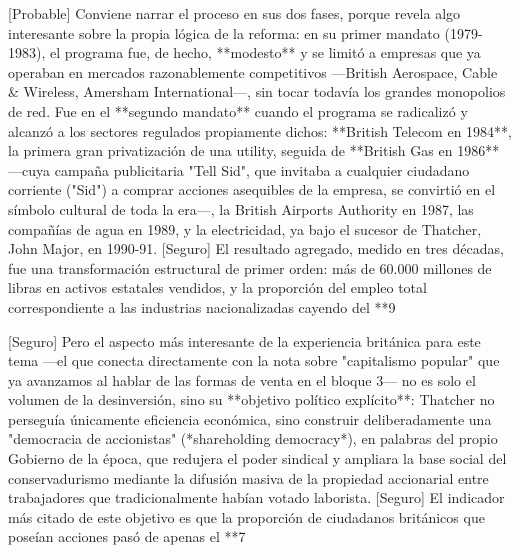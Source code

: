 \documentclass[10pt,a4paper]{article}
\begin{document}
[Probable] Conviene narrar el proceso en sus dos fases, porque revela algo interesante sobre la propia lógica de la reforma: en su primer mandato (1979-1983), el programa fue, de hecho, **modesto** y se limitó a empresas que ya operaban en mercados razonablemente competitivos —British Aerospace, Cable & Wireless, Amersham International—, sin tocar todavía los grandes monopolios de red. Fue en el **segundo mandato** cuando el programa se radicalizó y alcanzó a los sectores regulados propiamente dichos: **British Telecom en 1984**, la primera gran privatización de una utility, seguida de **British Gas en 1986** —cuya campaña publicitaria "Tell Sid", que invitaba a cualquier ciudadano corriente ("Sid") a comprar acciones asequibles de la empresa, se convirtió en el símbolo cultural de toda la era—, la British Airports Authority en 1987, las compañías de agua en 1989, y la electricidad, ya bajo el sucesor de Thatcher, John Major, en 1990-91. [Seguro] El resultado agregado, medido en tres décadas, fue una transformación estructural de primer orden: más de 60.000 millones de libras en activos estatales vendidos, y la proporción del empleo total correspondiente a las industrias nacionalizadas cayendo del **9%

[Seguro] Pero el aspecto más interesante de la experiencia británica para este tema —el que conecta directamente con la nota sobre "capitalismo popular" que ya avanzamos al hablar de las formas de venta en el bloque 3— no es solo el volumen de la desinversión, sino su **objetivo político explícito**: Thatcher no perseguía únicamente eficiencia económica, sino construir deliberadamente una "democracia de accionistas" (*shareholding democracy*), en palabras del propio Gobierno de la época, que redujera el poder sindical y ampliara la base social del conservadurismo mediante la difusión masiva de la propiedad accionarial entre trabajadores que tradicionalmente habían votado laborista. [Seguro] El indicador más citado de este objetivo es que la proporción de ciudadanos británicos que poseían acciones pasó de apenas el **7%
\end{document}
